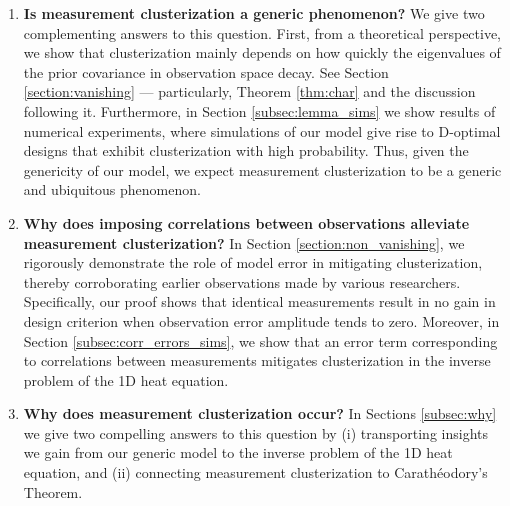 \begin{enumerate}
\item \label{q:generic} \textbf{Is measurement clusterization a
  generic phenomenon?}
  We give two complementing answers to this question. First, from a
  theoretical perspective, we show that clusterization mainly depends
  on how quickly the eigenvalues of the prior covariance in
  observation space decay.
  See Section \ref{section:vanishing} --- particularly, Theorem
  \ref{thm:char} and the discussion following it. Furthermore, in
  Section \ref{subsec:lemma_sims} we show results of numerical
  experiments, where simulations of our model give rise to D-optimal
  designs that exhibit clusterization with high probability. Thus,
  given the genericity of our model, we expect measurement
  clusterization to be a generic and ubiquitous phenomenon.

\item \label{q:mitigate} \textbf{Why does imposing correlations
  between observations alleviate measurement clusterization?} In
  Section \ref{section:non_vanishing}, we rigorously demonstrate the
  role of model error in mitigating clusterization, thereby
  corroborating earlier observations made by various
  researchers. Specifically, our proof shows that identical
  measurements result in no gain in design criterion when observation
  error amplitude tends to zero. Moreover, in Section
  \ref{subsec:corr_errors_sims}, we show that an error term
  corresponding to correlations between measurements mitigates
  clusterization in the inverse problem of the 1D heat equation.

\item \label{q:why} \textbf{Why does measurement clusterization
  occur?} In Sections \ref{subsec:why} we give two compelling answers
  to this question by (i) transporting insights we gain from our
  generic model to the inverse problem of the 1D heat equation, and
  (ii) connecting measurement clusterization to Carath\'eodory's
  Theorem.


\end{enumerate}
